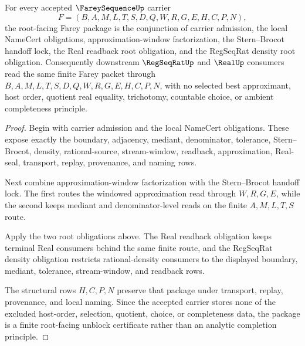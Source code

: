 \begin{theorem}
\label{thm:farey-sequence-root-unblock-package}
For every accepted $\FareySequenceUp$ carrier
$$
F=(B,A,M,L,T,S,D,Q,W,R,G,E,H,C,P,N),
$$
the root-facing Farey package is the conjunction of carrier admission, the local NameCert obligations, approximation-window factorization, the Stern--Brocot handoff lock, the Real readback root obligation, and the RegSeqRat density root obligation. Consequently downstream $\RegSeqRatUp$ and $\RealUp$ consumers read the same finite Farey packet through $B,A,M,L,T,S,D,Q,W,R,G,E,H,C,P,N$, with no selected best approximant, host order, quotient real equality, trichotomy, countable choice, or ambient completeness principle.
\end{theorem}
\begin{proof}
Begin with carrier admission and the local NameCert obligations. These expose exactly the boundary, adjacency, mediant, denominator, tolerance, Stern--Brocot, density, rational-source, stream-window, readback, approximation, Real-seal, transport, replay, provenance, and naming rows.

Next combine approximation-window factorization with the Stern--Brocot handoff lock. The first routes the windowed approximation read through $W,R,G,E$, while the second keeps mediant and denominator-level reads on the finite $A,M,L,T,S$ route.

Apply the two root obligations above. The Real readback obligation keeps terminal Real consumers behind the same finite route, and the RegSeqRat density obligation restricts rational-density consumers to the displayed boundary, mediant, tolerance, stream-window, and readback rows.

The structural rows $H,C,P,N$ preserve that package under transport, replay, provenance, and local naming. Since the accepted carrier stores none of the excluded host-order, selection, quotient, choice, or completeness data, the package is a finite root-facing unblock certificate rather than an analytic completion principle.
\end{proof}

